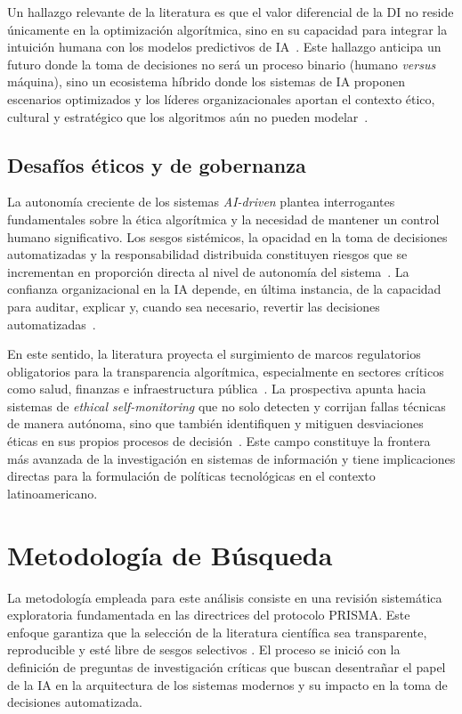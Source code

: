 \documentclass[conference]{IEEEtran}
\begin{document}
Un hallazgo relevante de la literatura es que el valor diferencial de la
DI no reside únicamente en la optimización algorítmica, sino en su
capacidad para integrar la intuición humana con los modelos predictivos
de IA~\cite{jeyanthi2022}. Este hallazgo anticipa un futuro donde la
toma de decisiones no será un proceso binario (humano \textit{versus}
máquina), sino un ecosistema híbrido donde los sistemas de IA proponen
escenarios optimizados y los líderes organizacionales aportan el contexto
ético, cultural y estratégico que los algoritmos aún no pueden
modelar~\cite{tasleem2024,natta2025}.
 
\subsection{Desafíos éticos y de gobernanza}
 
La autonomía creciente de los sistemas \textit{AI-driven} plantea
interrogantes fundamentales sobre la ética algorítmica y la necesidad de
mantener un control humano significativo. Los sesgos sistémicos, la
opacidad en la toma de decisiones automatizadas y la responsabilidad
distribuida constituyen riesgos que se incrementan en proporción directa
al nivel de autonomía del sistema~\cite{tasleem2024}. La confianza
organizacional en la IA depende, en última instancia, de la capacidad
para auditar, explicar y, cuando sea necesario, revertir las decisiones
automatizadas~\cite{natta2025}.
 
En este sentido, la literatura proyecta el surgimiento de marcos
regulatorios obligatorios para la transparencia algorítmica, especialmente
en sectores críticos como salud, finanzas e infraestructura
pública~\cite{storey2025genai}. La prospectiva apunta hacia sistemas de
\textit{ethical self-monitoring} que no solo detecten y corrijan fallas
técnicas de manera autónoma, sino que también identifiquen y mitiguen
desviaciones éticas en sus propios procesos de decisión~\cite{natta2025}.
Este campo constituye la frontera más avanzada de la investigación en
sistemas de información y tiene implicaciones directas para la formulación
de políticas tecnológicas en el contexto latinoamericano.

\section{Metodología de Búsqueda}
La metodología empleada para este análisis consiste en una revisión sistemática exploratoria fundamentada en las directrices del protocolo PRISMA. Este enfoque garantiza que la selección de la literatura científica sea transparente, reproducible y esté libre de sesgos selectivos \cite{natta2025}. El proceso se inició con la definición de preguntas de investigación críticas que buscan desentrañar el papel de la IA en la arquitectura de los sistemas modernos y su impacto en la toma de decisiones automatizada.
\end{document}
